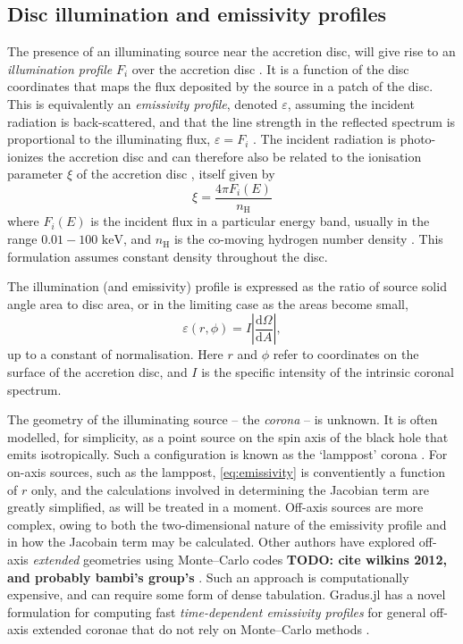 \documentclass[fleqn,usenatbib]{mnras}
\newcommand{\todo}[1]{{\noindent \bf \color{red} TODO: #1}}
\newcommand{\software}[1]{{\sc #1}}
\newcommand{\Gradus}{\software{Gradus.jl}\xspace}
\renewcommand{\d}{\text{d}}
\begin{document}
\subsection{Disc illumination and emissivity profiles}
\label{sec:emissivity-profiles}

The presence of an illuminating source near the accretion disc, will give rise
to an \emph{illumination profile} $F_i$ over the accretion disc
\citep{svensson_corona_1994}. It is a function of the disc coordinates that maps
the flux deposited by the source in a patch of the disc. This is equivalently an
\emph{emissivity profile}, denoted $\varepsilon$, assuming the incident
radiation is back-scattered, and that the line strength in the reflected
spectrum is proportional to the illuminating flux, $\varepsilon = F_i$
\citep{wilkins_understanding_2012}. The incident radiation is photo-ionizes the
accretion disc and can therefore also be related to the ionisation parameter
$\xi$ of the accretion disc \citep{laor_line_1991,ross_effects_1993}, itself
given by
\begin{equation}
    \xi = \frac{4 \pi F_i (E)}{n_\text{H}}
\end{equation}
where $F_i (E)$ is the incident flux in a particular energy band, usually in the
range $0.01 - 100 \text{ keV}$, and $n_\text{H}$ is the co-moving hydrogen
number density \citep{ross_effects_1993}. This formulation assumes constant
density throughout the disc.

The illumination (and emissivity) profile is expressed as the ratio of source
solid angle area to disc area, or in the limiting case as the areas become
small,
\begin{equation}
    \varepsilon (r, \phi) = I \left\lvert \frac{\d \Omega}{\d A} \right\rvert,
\end{equation} \label{eq:emissivity}
up to a constant of normalisation.
Here $r$ and $\phi$ refer to coordinates on the surface of the accretion disc,
and $I$ is the specific intensity of the intrinsic coronal spectrum.

The geometry of the illuminating source -- the \emph{corona} -- is unknown. It
is often modelled, for simplicity, as a point source on the spin axis of the
black hole that emits isotropically. Such a configuration is known as the
`lamppost' corona \citep[e.g.][]{fukumura_accretion_2007}. For on-axis sources,
such as the lamppost, \eqref{eq:emissivity} is conventiently a function of $r$
only, and the calculations involved in determining the Jacobian term are greatly
simplified, as will be treated in a moment. Off-axis sources are more complex,
owing to both the two-dimensional nature of the emissivity profile and in how
the Jacobain term may be calculated. Other authors have explored off-axis
\emph{extended} geometries using Monte--Carlo codes \todo{cite wilkins 2012, and
probably bambi's group's} \citep{wilkins_towards_2016, gonzalez_probing_2017}.
Such an approach is computationally expensive, and can require some form of
dense tabulation. \Gradus has a novel formulation for computing fast
\emph{time-dependent emissivity profiles} for general off-axis extended coronae
that do not rely on Monte--Carlo methods \citep{baker_2025}.
\end{document}
